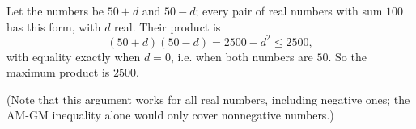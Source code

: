 Let the numbers be $50+d$ and $50-d$; every pair of real numbers with sum $100$ has this form, with $d$ real. Their product is
\[(50+d)(50-d)=2500-d^2\le2500,\]
with equality exactly when $d=0$, i.e. when both numbers are $50$. So the maximum product is $\boxed{2500}$.

(Note that this argument works for all real numbers, including negative ones; the AM-GM inequality alone would only cover nonnegative numbers.)
